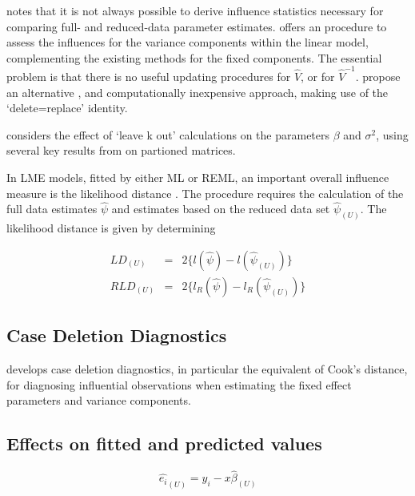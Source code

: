 \documentclass[12pt, a4paper]{report}
\begin{document}
\citet{schabenberger} notes that it is not always possible to
derive influence statistics necessary for comparing full- and
reduced-data parameter estimates. \citet{HaslettDillane} offers an
procedure to assess the influences for the variance components
within the linear model, complementing the existing methods for
the fixed components. The essential problem is that there is no
useful updating procedures for $\hat{V}$, or for $\hat{V}^{-1}$.
\citet{HaslettDillane} propose an alternative , and
computationally inexpensive approach, making use of the
`delete=replace' identity.

\citet{Haslett99} considers the effect of `leave k out'
calculations on the parameters $\beta$ and $\sigma^{2}$, using
several key results from \citet{HaslettHayes} on partioned
matrices.






In LME models, fitted by either ML or REML, an important overall
influence measure is the likelihood distance \citep{cook82}. The
procedure requires the calculation of the full data estimates
$\hat{\psi}$ and estimates based on the reduced data set
$\hat{\psi}_{(U)}$. The likelihood distance is given by
determining


\begin{eqnarray}
LD_{(U)} &=& 2\{l(\hat{\psi}) - l( \hat{\psi}_{(U)}) \}\\
RLD_{(U)} &=& 2\{l_{R}(\hat{\psi}) - l_{R}(\hat{\psi}_{(U)})\}
\end{eqnarray}



\newpage
\subsection{Case Deletion Diagnostics} %


\citet{CPJ} develops  case deletion diagnostics, in particular the equivalent of  Cook's distance, for diagnosing influential observations when estimating the fixed effect parameters and variance components.

\subsection{Effects on fitted and predicted values}
\begin{equation}
\hat{e_{i}}_{(U)} = y_{i} - x\hat{\beta}_{(U)}
\end{equation}
\end{document}
